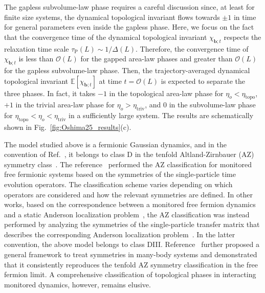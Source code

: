 \documentclass[preprint,pteplogo]{ptephy_v2}%
\numberwithin{equation}{section}
\theoremstyle{definition}
\begin{document}
The gapless subvolume-law phase requires a careful discussion since, at least for finite size systems, the dynamical topological invariant flows towards $\pm1$ in time for general parameters even inside the gapless phase.
Here, we focus on the fact that the convergence time of the dynamical topological invariant $\chi_{\bm{b};t}$ respects the relaxation time scale $\tau_\mathrm{P}(L) \sim 1/\Delta(L)$.
Therefore, the convergence time of $\chi_{\bm{b};t}$ is less than $\mathcal{O}(L)$ for the gapped area-law phases and greater than $\mathcal{O}(L)$ for the gapless subvolume-law phase.
Then, the trajectory-averaged dynamical topological invariant $\mathbb{E}[\chi_{\bm{b};t}]$ at time $t=\mathcal{O}(L)$ is expected to separate the three phases.
In fact, it takes $-1$ in the topological area-law phase for $\eta_o<\eta_{\mathrm{topo}}$, $+1$ in the trivial area-law phase for $\eta_o>\eta_{\mathrm{triv}}$, and $0$ in the subvolume-law phase for $\eta_{\mathrm{topo}}<\eta_o<\eta_{\mathrm{triv}}$ in a sufficiently large system.
The results are schematically shown in Fig.~\ref{fig:Oshima25_results}(c).

The model studied above is a fermionic Gaussian dynamics, and in the convention of Ref.~\cite{xiao2024topology}, it belongs to class D in the tenfold Altland-Zirnbauer (AZ) symmetry class~\cite{altland1997nonstandard}.
The reference~\cite{xiao2024topology} performed the AZ classification for monitored free fermionic systems based on the symmetries of the single-particle time evolution operators.
The classification scheme varies depending on which operators are considered and how the relevant symmetries are defined.
In other works, based on the correspondence between a monitored free fermion dynamics and a static Anderson localization problem~\cite{Jian22criticality, fava2023nonlinear, Poboiko23Thoery}, the AZ classification was instead performed by analyzing the symmetries of the single-particle transfer matrix that describes the corresponding Anderson localization problem~\cite{pan2024topological, Bhuiyan2025freefermion}.
In the latter convention, the above model belongs to class DIII.
Reference~\cite{Bhuiyan2025freefermion} further proposed a general framework to treat symmetries in many-body systems and demonstrated that it consistently reproduces the tenfold AZ symmetry classification in the free fermion limit.
A comprehensive classification of topological phases in interacting monitored dynamics, however, remains elusive.

\end{document}
